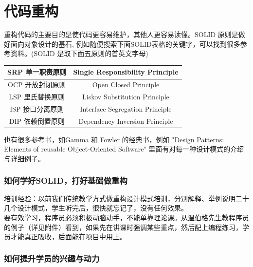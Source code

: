 \chapter{代码重构} %

重构代码的主要目的是使代码更容易维护，其他人更容易读懂。SOLID
原则是做好面向对象设计的基石,
例如随便搜索下面SOLID表格的关键字，可以找到很多参考资料。(SOLID
是取下面五原则的首英文字母)



\begin{tabular}{|c|c|}
\hline
SRP 单一职责原则&Single Responsibility Principle \\
\hline
OCP 开放封闭原则&Open Closed Principle \\
\hline
LSP 里氏替换原则&Liskov Substitution Principle \\
\hline
ISP 接口分离原则&Interface Segregation Principle \\
\hline
DIP 依赖倒置原则&Dependency Inversion Principle\\
\hline
\end{tabular}

也有很多参考书，如Gamma 和 Fowler 的经典书，例如 "Design Patterns:
Elements of reusable Object-Oriented Software"
里面有对每一种设计模式的介绍与详细例子。

\hypertarget{ux5982ux4f55ux5b66ux597dsolidux6253ux597dux57faux7840ux505aux91cdux6784}{%
\subsection{如何学好SOLID，打好基础做重构}\label{ux5982ux4f55ux5b66ux597dsolidux6253ux597dux57faux7840ux505aux91cdux6784}}

培训经验：以前我们传统教学方式做重构设计模式培训，分别解释、举例说明二十几个设计模式，学生听完后，很快就忘记了，没有任何效果。\\
要有效学习，程序员必须积极动脑动手，不能单靠理论课。从温伯格先生教程序员的例子（详见附件）看到，如果先在讲课时强调某些重点，然后配上编程练习，学员才能真正吸收，后面能在项目中用上。

\hypertarget{ux5982ux4f55ux63d0ux5347ux5b66ux5458ux7684ux5174ux8da3ux4e0eux52a8ux529b}{%
\subsection{如何提升学员的兴趣与动力}\label{ux5982ux4f55ux63d0ux5347ux5b66ux5458ux7684ux5174ux8da3ux4e0eux52a8ux529b}}

